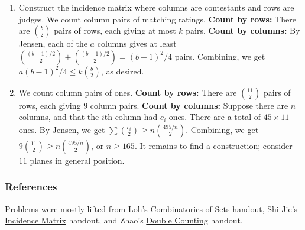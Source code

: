 \documentclass[11pt,paper=letter]{scrartcl}
\newcommand{\cbyrows}{{\bfseries \color{RowBlue} Count by rows: }}
\newcommand{\cbycols}{{\bfseries \color{ColOrange} Count by columns: }}
\begin{document}
\begin{enumerate}
\item Construct the incidence matrix where columns are contestants and rows are judges. We count column pairs of matching ratings. \cbyrows There are $\binom b2$ pairs of rows, each giving at most $k$ pairs. \cbycols By Jensen, each of the $a$ columns gives at least $\binom{(b-1)/2}{2} + \binom{(b+1)/2}{2} = (b-1)^2/4$ pairs. Combining, we get $a(b-1)^2/4 \le k\binom b2$, as desired.

\item We count column pairs of ones. \cbyrows There are $\binom{11}{2}$ pairs of rows, each giving $9$ column pairs. \cbycols Suppose there are $n$ columns, and that the $i$th column had $c_i$ ones. There are a total of $45 \times 11$ ones. By Jensen, we get $\sum \binom{c_i}{2} \ge n\binom{495/n}{2}$. Combining, we get $9\binom{11}{2} \ge n\binom{495/n}{2}$, or $n \ge 165$. It remains to find a construction; consider $11$ planes in general position.

\end{enumerate}

\subsubsection*{References}

Problems were mostly lifted from Loh's \href{https://www.math.cmu.edu/~lohp/docs/math/mop2011/combin-sets.pdf}{Combinatorics of Sets} handout, Shi-Jie's \href{https://www.scribd.com/document/87289070/HCMOP-Open-Incidence-Matrix-Solutions}{Incidence Matrix} handout, and Zhao's \href{https://yufeizhao.com/olympiad/doublecounting_mop.pdf}{Double Counting} handout.
\end{document}
